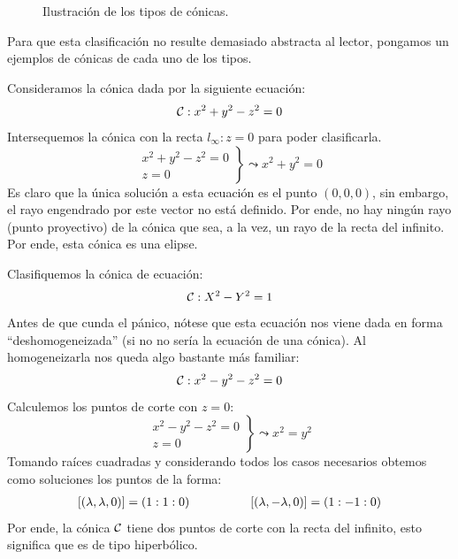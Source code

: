 \begin{figure}[h]
	\caption{Ilustración de los tipos de cónicas.}
	\label{C7_img_tiposConicas}
\end{figure}
Para que esta clasificación no resulte demasiado abstracta al lector, pongamos un ejemplos de cónicas de cada uno de los tipos.
\begin{exa}[Elipse]
	\label{C8_exa_elipse}
	Consideramos la cónica dada por la siguiente ecuación:
	\[\mathcal{C}:x^2+y^2-z^2=0\]
	Intersequemos la cónica con la recta $l_\infty:z=0$ para poder clasificarla.
	\[\left.\begin{array}{c}
	x^2+y^2-z^2=0\\
	z=0
	\end{array}\right\}\leadsto x^2+y^2=0\]
	Es claro que la única solución a esta ecuación es el punto $(0,0,0)$, sin embargo, el rayo engendrado por este vector no está definido. Por ende, no hay ningún rayo (punto proyectivo) de la cónica que sea, a la vez, un rayo de la recta del infinito. Por ende, esta cónica es una elipse.
\end{exa}
\begin{exa}[Hipérbola]
	Clasifiquemos la cónica de ecuación:
	\[\mathcal{C}:X^2-Y^2=1\]
	Antes de que cunda el pánico, nótese que esta ecuación nos viene dada en forma ``deshomogeneizada'' (si no no sería la ecuación de una cónica). Al homogeneizarla nos queda algo bastante más familiar:
	\[\mathcal{C}:x^2-y^2-z^2=0\]
	Calculemos los puntos de corte con $z=0$:
	\[\left.\begin{array}{c}
	x^2-y^2-z^2=0\\
	z=0
	\end{array}\right\}\leadsto x^2=y^2\]
	Tomando raíces cuadradas y considerando todos los casos necesarios obtemos como soluciones los puntos de la forma:
	\[\begin{array}{cc}
	\left [ (\lambda,\lambda,0) \right ]=(1:1:0)\qquad & \qquad \left [ (\lambda,-\lambda,0) \right ]=(1:-1:0)
	\end{array}\]
	Por ende, la cónica $\mathcal{C}$ tiene dos puntos de corte con la recta del infinito, esto significa que es de tipo hiperbólico.
\end{exa}
